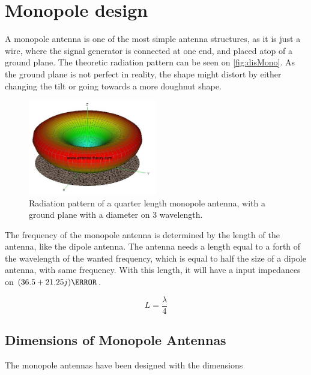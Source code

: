 \chapter{Monopole design}

A monopole antenna is one of the most simple antenna structures, as it is just a wire, where the signal generator is connected at one end, and placed atop of a ground plane. The theoretic radiation pattern can be seen on \autoref{fig:disMono}. As the ground plane is not perfect in reality, the shape might distort by either changing the tilt or going towards a more doughnut shape.

\begin{figure}[H]
\centering
\includegraphics[width=0.5\textwidth]{figure/disturbedMonopole.jpg}
\caption{Radiation pattern of a quarter length monopole antenna, with a ground plane with a diameter on 3 wavelength.}
\label{fig:disMono}
\end{figure}

The frequency of the monopole antenna is determined by the length of the antenna, like the dipole antenna. The antenna needs a length equal to a forth of the wavelength of the wanted frequency, which is equal to half the size of a dipole antenna, with same frequency. With this length, it will have a input impedances on $(36.5 + 21.25j) \ohm$.

\begin{equation}\label{eq:lengthMono}
L = \frac{\lambda}{4}
\end{equation}
\begin{where}
\end{where}

\section{Dimensions of Monopole Antennas}

The monopole antennas have been designed with the dimensions

